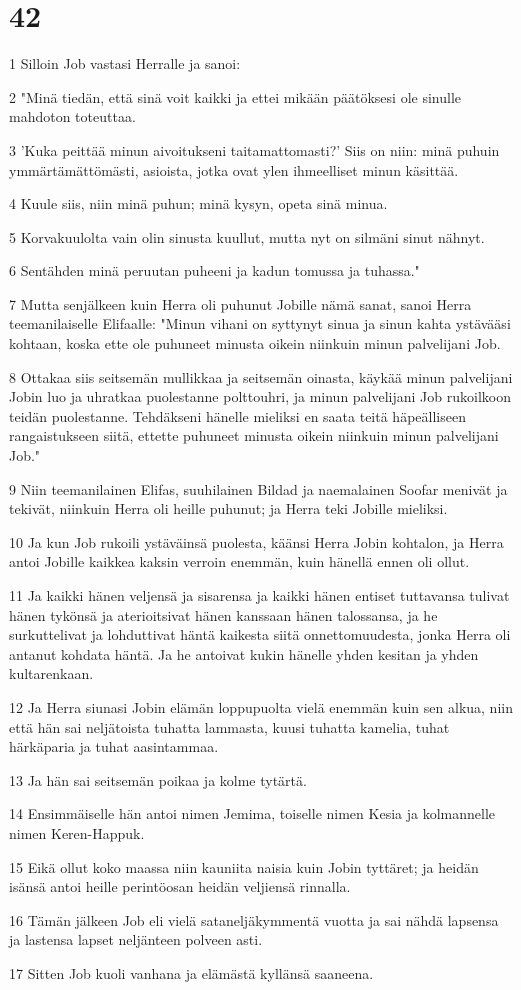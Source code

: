 \chapter{42}

\par 1 Silloin Job vastasi Herralle ja sanoi:
\par 2 "Minä tiedän, että sinä voit kaikki ja ettei mikään päätöksesi ole sinulle mahdoton toteuttaa.
\par 3 'Kuka peittää minun aivoitukseni taitamattomasti?' Siis on niin: minä puhuin ymmärtämättömästi, asioista, jotka ovat ylen ihmeelliset minun käsittää.
\par 4 Kuule siis, niin minä puhun; minä kysyn, opeta sinä minua.
\par 5 Korvakuulolta vain olin sinusta kuullut, mutta nyt on silmäni sinut nähnyt.
\par 6 Sentähden minä peruutan puheeni ja kadun tomussa ja tuhassa."
\par 7 Mutta senjälkeen kuin Herra oli puhunut Jobille nämä sanat, sanoi Herra teemanilaiselle Elifaalle: "Minun vihani on syttynyt sinua ja sinun kahta ystävääsi kohtaan, koska ette ole puhuneet minusta oikein niinkuin minun palvelijani Job.
\par 8 Ottakaa siis seitsemän mullikkaa ja seitsemän oinasta, käykää minun palvelijani Jobin luo ja uhratkaa puolestanne polttouhri, ja minun palvelijani Job rukoilkoon teidän puolestanne. Tehdäkseni hänelle mieliksi en saata teitä häpeälliseen rangaistukseen siitä, ettette puhuneet minusta oikein niinkuin minun palvelijani Job."
\par 9 Niin teemanilainen Elifas, suuhilainen Bildad ja naemalainen Soofar menivät ja tekivät, niinkuin Herra oli heille puhunut; ja Herra teki Jobille mieliksi.
\par 10 Ja kun Job rukoili ystäväinsä puolesta, käänsi Herra Jobin kohtalon, ja Herra antoi Jobille kaikkea kaksin verroin enemmän, kuin hänellä ennen oli ollut.
\par 11 Ja kaikki hänen veljensä ja sisarensa ja kaikki hänen entiset tuttavansa tulivat hänen tykönsä ja aterioitsivat hänen kanssaan hänen talossansa, ja he surkuttelivat ja lohduttivat häntä kaikesta siitä onnettomuudesta, jonka Herra oli antanut kohdata häntä. Ja he antoivat kukin hänelle yhden kesitan ja yhden kultarenkaan.
\par 12 Ja Herra siunasi Jobin elämän loppupuolta vielä enemmän kuin sen alkua, niin että hän sai neljätoista tuhatta lammasta, kuusi tuhatta kamelia, tuhat härkäparia ja tuhat aasintammaa.
\par 13 Ja hän sai seitsemän poikaa ja kolme tytärtä.
\par 14 Ensimmäiselle hän antoi nimen Jemima, toiselle nimen Kesia ja kolmannelle nimen Keren-Happuk.
\par 15 Eikä ollut koko maassa niin kauniita naisia kuin Jobin tyttäret; ja heidän isänsä antoi heille perintöosan heidän veljiensä rinnalla.
\par 16 Tämän jälkeen Job eli vielä sataneljäkymmentä vuotta ja sai nähdä lapsensa ja lastensa lapset neljänteen polveen asti.
\par 17 Sitten Job kuoli vanhana ja elämästä kyllänsä saaneena.


